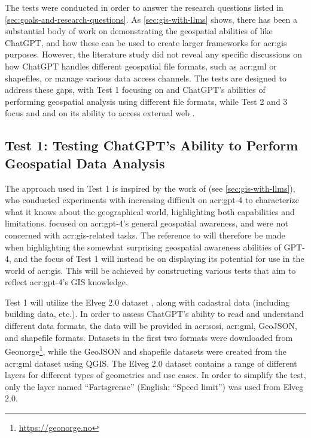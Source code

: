The tests were conducted in order to answer the research questions listed in \autoref{sec:goals-and-research-questions}. As \autoref{sec:gis-with-llms} shows, there has been a substantial body of work on demonstrating the geospatial abilities of  like ChatGPT, and how these can be used to create larger frameworks for \acrshort{acr:gis} purposes. However, the literature study did not reveal any specific discussions on how ChatGPT handles different geospatial file formats, such as \acrshort{acr:gml} or shapefiles, or manage various data access channels. The tests are designed to address these gaps, with Test 1 focusing on  and ChatGPT's abilities of performing geospatial analysis using different file formats, while Test 2 and 3 focus  and  and on its ability to access external web .

\subsection{Test 1: Testing ChatGPT's Ability to Perform Geospatial Data Analysis}

The approach used in Test 1 is inspired by the work of \cite{robertsGPT4GEOHowLanguage2023} (see \autoref{sec:gis-with-llms}), who conducted experiments with increasing difficult on \acrshort{acr:gpt}-4 to characterize what it knows about the geographical world, highlighting both capabilities and limitations. \citeauthor{robertsGPT4GEOHowLanguage2023} focused on \acrshort{acr:gpt}-4's general geospatial awareness, and were not concerned with \acrshort{acr:gis}-related tasks. The reference to \cite{robertsGPT4GEOHowLanguage2023} will therefore be made when highlighting the somewhat surprising geospatial awareness abilities of GPT-4, and the focus of Test 1 will instead be on displaying its potential for use in the world of \acrshort{acr:gis}. This will be achieved by constructing various tests that aim to reflect \acrshort{acr:gpt}-4's GIS knowledge.

Test 1 will utilize the Elveg 2.0 dataset \citep{thenorwegianmappingauthorityElveg2019}, along with cadastral data (including building data, etc.). In order to assess ChatGPT's ability to read and understand different data formats, the data will be provided in \acrshort{acr:sosi}, \acrshort{acr:gml}, GeoJSON, and shapefile formats. Datasets in the first two formats were downloaded from Geonorge\footnote{\url{https://geonorge.no}}, while the GeoJSON and shapefile datasets were created from the \acrshort{acr:gml} dataset using QGIS. The Elveg 2.0 dataset contains a range of different layers for different types of geometries and use cases. In order to simplify the test, only the layer named \enquote{Fartsgrense} (English: \enquote{Speed limit}) was used from Elveg 2.0.

